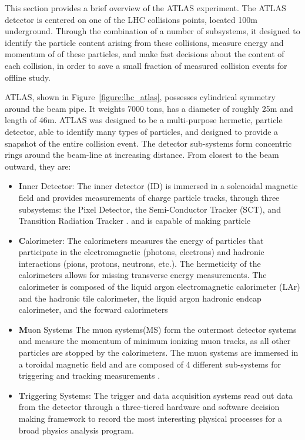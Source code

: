 This section provides a brief overview of the ATLAS experiment. The ATLAS detector
is centered on one of the LHC collisions points, located 100m underground. Through
the combination of a number of subsystems, it designed to identify the 
particle content arising from these collisions, measure energy and momentum of  
of these particles, and make fast decisions about the content
of each collision, in order to save a small fraction of measured collision events
for offline study. 

ATLAS, shown in Figure~\ref{figure:lhc_atlas},  possesses cylindrical symmetry around the beam pipe. It weights 7000 tons,
has a diameter of roughly 25m and length of 46m. ATLAS was designed to be a multi-purpose
hermetic, particle detector, able to identify many types of particles, and designed to provide
a snapshot of the entire collision event. The detector sub-systems form concentric rings 
around the beam-line at increasing distance. From closest to the beam outward, they are:

\begin{itemize}

\item {\textbf Inner Detector:} The inner detector (ID)\cite{IDTDR1,IDTDR2} is immersed in a solenoidal magnetic field\cite{MagnetTDR} and provides measurements of charge particle tracks, through three subsystems: the Pixel Detector\cite{PixelTDR,PixelSensor}, the Semi-Conductor Tracker (SCT)\cite{SCTBarrel,SCTEndcap}, and Transition Radiation Tracker \cite{TRTStraws, TRTBarrel,trtelec}. 
and is capable of making particle
\item {\textbf Calorimeter:} The calorimeters measures the energy of particles that participate in the electromagnetic (photons, electrons) and hadronic interactions (pions, protons, neutrons, etc.). The hermeticity of the calorimeters allows for missing transverse energy measurements. The calorimeter is composed of the liquid argon electromagnetic calorimeter (LAr)\cite{LArTDR:1996fq} and the hadronic tile calorimeter\cite{TileTDR}, the liquid argon hadronic endcap calorimeter, and the forward calorimeters 

\item {\textbf Muon Systems} The muon systems(MS)\cite{MuonTDR} form the outermost detector systems and measure the momentum of minimum ionizing muon tracks, as all other particles are stopped by the calorimeters. The muon systems are immersed in a toroidal magnetic field \cite{MagnetTDR} and are composed of 4 different sub-systems for triggering and tracking measurements \cite{RPCPaper,MDTPaper,CSCPaper}. 

\item {\textbf Triggering Systems:}  The trigger and data acquisition systems\cite{L1TDR,HLTTDR} read out data from the detector through a three-tiered hardware and software decision making framework to record the most interesting physical processes for a broad physics analysis program.   

\end{itemize}


